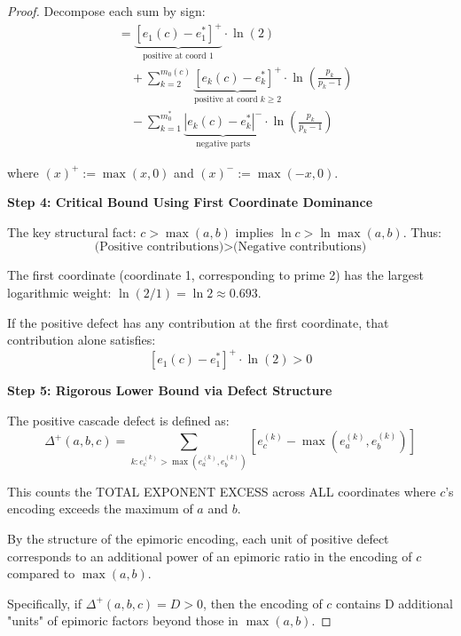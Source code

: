 \begin{proof}
Decompose each sum by sign:
\begin{align}
&= \underbrace{\left[e_1(c) - e_1^{*}\right]^+}_{\text{positive at coord 1}} \cdot \ln(2) \\
&\quad + \sum_{k=2}^{m_0(c)} \underbrace{\left[e_k(c) - e_k^{*}\right]^+}_{\text{positive at coord } k \geq 2} \cdot \ln\left(\frac{p_k}{p_k - 1}\right) \\
&\quad - \sum_{k=1}^{m_0^{*}} \underbrace{\left|e_k(c) - e_k^{*}\right|^-}_{\text{negative parts}} \cdot \ln\left(\frac{p_k}{p_k - 1}\right)
\end{align}

where $(x)^+ := \max(x, 0)$ and $(x)^- := \max(-x, 0)$.

\noindent \textbf{Step 4: Critical Bound Using First Coordinate Dominance}

The key structural fact: $c > \max(a,b)$ implies $\ln c > \ln \max(a,b)$. Thus:
\begin{equation}
\text{(Positive contributions)} > \text{(Negative contributions)}
\end{equation}

The first coordinate (coordinate 1, corresponding to prime 2) has the largest logarithmic weight: $\ln(2/1) = \ln 2 \approx 0.693$.

If the positive defect has any contribution at the first coordinate, that contribution alone satisfies:
\begin{equation}
\left[e_1(c) - e_1^{*}\right]^+ \cdot \ln(2) > 0
\end{equation}

\noindent \textbf{Step 5: Rigorous Lower Bound via Defect Structure}

The positive cascade defect is defined as:
\begin{equation}
\Delta^{+}(a,b,c) = \sum_{k: e_c^{(k)} > \max(e_a^{(k)}, e_b^{(k)})} \left[e_c^{(k)} - \max(e_a^{(k)}, e_b^{(k)})\right]
\end{equation}

This counts the TOTAL EXPONENT EXCESS across ALL coordinates where $c$'s encoding exceeds the maximum of $a$ and $b$.

By the structure of the epimoric encoding, each unit of positive defect corresponds to an additional power of an epimoric ratio in the encoding of $c$ compared to $\max(a,b)$.

Specifically, if $\Delta^{+}(a,b,c) = D > 0$, then the encoding of $c$ contains D additional "units" of epimoric factors beyond those in $\max(a,b)$.


\end{proof}
